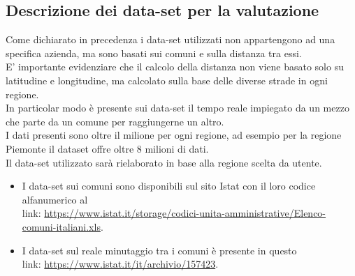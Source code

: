 \documentclass[a4paper,12pt]{report}
\begin{document}
\subsection*{Descrizione dei data-set per la valutazione}
Come dichiarato in precedenza i data-set utilizzati non appartengono ad una specifica azienda, ma sono basati sui comuni e sulla distanza tra essi.\\
E' importante evidenziare che il calcolo della distanza non viene basato solo su latitudine e longitudine, ma calcolato sulla base delle diverse strade in ogni regione.\\
In particolar modo è presente sui data-set il tempo reale impiegato da un mezzo che parte da un comune per raggiungerne un altro.\\
I dati presenti sono oltre il milione per ogni regione, ad esempio per la regione Piemonte il dataset offre oltre 8 milioni di dati.\\
Il data-set utilizzato sarà rielaborato in base alla regione scelta da utente.\\
\begin{itemize}
\item I data-set sui comuni sono disponibili sul sito Istat con il loro codice alfanumerico al \\link: \href{https://www.istat.it/storage/codici-unita-amministrative/Elenco-comuni-italiani.xls}{https://www.istat.it/storage/codici-unita-amministrative/Elenco-comuni-italiani.xls}.
\item I data-set sul reale minutaggio tra i comuni è presente in questo\\ link:
\href{https://www.istat.it/it/archivio/157423}{https://www.istat.it/it/archivio/157423}.
\end{itemize}
\end{document}
